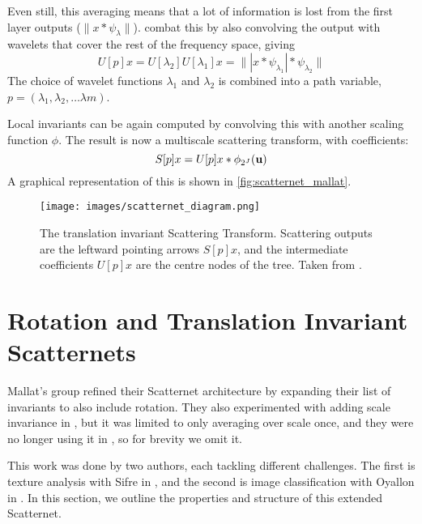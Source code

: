   Even still, this averaging means that a lot of information is lost from the
  first layer outputs ($\|x \ast \psi_{\lambda}\|$).
  \citeauthor{bruna_invariant_2013} combat this by also convolving the output
  with wavelets that cover the rest of the frequency space, giving  
  $$U[p]x = U[\lambda_2]U[\lambda_1]x = \| | x \ast \psi_{\lambda_1}| 
    \ast \psi_{\lambda_2} \|$$
  The choice of wavelet functions $\lambda_{1}$ and $\lambda_{2}$ is combined
  into a path variable, $p = (\lambda_1, \lambda_2, \ldots \lambda{m})$.

  Local invariants can be again computed by convolving this with another scaling
  function $\phi$. The result is now a multiscale scattering transform, with
  coefficients:
  $$ S[p]x = U[p]x \ast \phi_{2^J}(\mathbf{u}) $$
  A graphical representation of this is shown in
  \autoref{fig:scatternet_mallat}.

  \begin{figure}
    \centering
      \texttt{[image: images/scatternet\_diagram.png]}
      \caption[Translation Invariant Scatternet Layout]
              {The translation invariant Scattering Transform. Scattering outputs
               are the leftward pointing arrows $S[p]x$, and the intermediate 
               coefficients $U[p]x$ are the centre nodes of the tree. Taken
               from \citep{bruna_invariant_2013}.}
      \label{fig:scatternet_mallat}
  \end{figure}


\section{Rotation and Translation Invariant Scatternets}
  Mallat's group refined their Scatternet architecture by expanding their list
  of invariants to also include rotation. They also experimented with adding
  scale invariance in \citep{sifre_rotation_2013}, but it was limited to only
  averaging over scale once, and they were no longer using
  it in \citep{oyallon_deep_2015}, so for brevity we omit it. 
  
  This work was done by two authors, each tackling different
  challenges. The first is texture analysis with Sifre in
  \citep{sifre_combined_2012, sifre_rotation_2013, sifre_rigid-motion_2014,
  sifre_rigid-motion_2014-1}, and the second is image classification with
  Oyallon in \citep{oyallon_generic_2013, oyallon_deep_2015}. In this section,
  we outline the properties and structure of this extended Scatternet.


